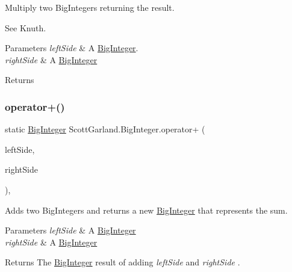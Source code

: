 Multiply two Big\+Integers returning the result. 

See Knuth. 


\begin{DoxyParams}{Parameters}
{\em left\+Side} & A \hyperlink{class_scott_garland_1_1_big_integer}{Big\+Integer}.\\
\hline
{\em right\+Side} & A \hyperlink{class_scott_garland_1_1_big_integer}{Big\+Integer}\\
\hline
\end{DoxyParams}
\begin{DoxyReturn}{Returns}

\end{DoxyReturn}
\mbox{\label{class_scott_garland_1_1_big_integer_aa0f043b20ba83229df2817492330c966}} 
\subsubsection{\texorpdfstring{operator+()}{operator+()}}
{\footnotesize\ttfamily static \hyperlink{class_scott_garland_1_1_big_integer}{Big\+Integer} Scott\+Garland.\+Big\+Integer.\+operator+ (\begin{DoxyParamCaption}\item[{\hyperlink{class_scott_garland_1_1_big_integer}{Big\+Integer}}]{left\+Side,  }\item[{\hyperlink{class_scott_garland_1_1_big_integer}{Big\+Integer}}]{right\+Side }\end{DoxyParamCaption})\hspace{0.3cm}{\ttfamily [inline]}, {\ttfamily [static]}}



Adds two Big\+Integers and returns a new \hyperlink{class_scott_garland_1_1_big_integer}{Big\+Integer} that represents the sum. 


\begin{DoxyParams}{Parameters}
{\em left\+Side} & A \hyperlink{class_scott_garland_1_1_big_integer}{Big\+Integer}\\
\hline
{\em right\+Side} & A \hyperlink{class_scott_garland_1_1_big_integer}{Big\+Integer}\\
\hline
\end{DoxyParams}
\begin{DoxyReturn}{Returns}
The \hyperlink{class_scott_garland_1_1_big_integer}{Big\+Integer} result of adding {\itshape left\+Side}  and {\itshape right\+Side} .
\end{DoxyReturn}
\mbox{\label{class_scott_garland_1_1_big_integer_a587f039d590d2dd6e8135fc1b74c82c1}} 
